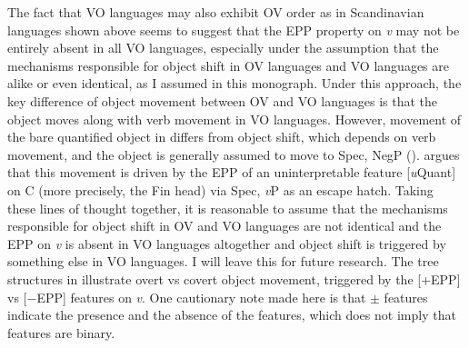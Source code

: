 {    The fact that \ac{VO} languages may also exhibit \ac{OV} order as in Scandinavian languages shown above seems to suggest that the \ac{EPP} property on \textit{v} may not be entirely absent in all \ac{VO} languages, especially under the assumption that the mechanisms responsible for object shift in \ac{OV} languages and \ac{VO} languages are alike or even identical, as I assumed in this monograph. Under this approach, the key difference of object movement between \ac{OV} and \ac{VO} languages is that the object moves along with verb movement in \ac{VO} languages. However, movement of the bare quantified object in  differs from object shift, which depends on verb movement, and the object is generally assumed to move to Spec, NegP (\citealt{Haegeman1995,HaegemanZanuttini1991,Jonsson1996,Kayne1998,Platzack1998,Rognvaldsson1987,Sells2000,Svenonius2002}). \citet{Christensen2004} argues that this movement is driven by the \ac{EPP} of an uninterpretable feature [\textit{u}Quant] on C (more precisely, the Fin head) via Spec, \textit{v}P as an escape hatch. Taking these lines of thought together, it is reasonable to assume that the mechanisms responsible for object shift in \ac{OV} and \ac{VO} languages are not identical and the \ac{EPP} on \textit{v} is absent in \ac{VO} languages altogether and object shift is triggered by something else in \ac{VO} languages. I will leave this for future research.
} The tree structures in  illustrate overt vs covert object movement, triggered by the [+\ac{EPP}] vs [$-$\ac{EPP}] features on \textit{v}. One cautionary note made here is that $\pm$ features indicate the presence and the absence of the features, which does not imply that features are binary.
\newpage

\ea\label{ex:51}
\z

